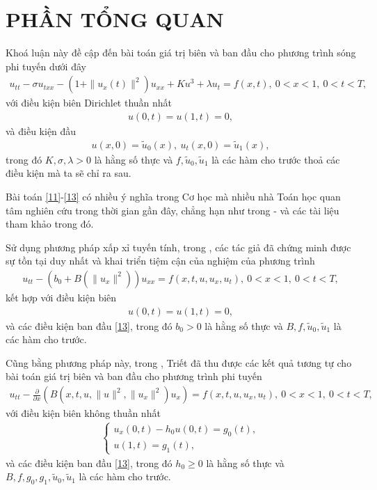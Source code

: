 \documentclass[12pt,a4paper]{article}
\theoremstyle{definition}
\theoremstyle{definition}
\begin{document}
\section[Phần tổng quan]{PHẦN TỔNG QUAN}

Khoá luận này đề cập đến bài toán giá trị biên và ban đầu cho phương trình sóng phi tuyến dưới đây
\begin{align} \label{11}
    u_{tt} - \sigma u_{txx} - \left(1 + \|u_x(t)\|^2\right) u_{xx} + Ku^3 + \lambda u_t = f(x,t),\ 0 < x < 1,\ 0 < t < T,
\end{align}
với điều kiện biên Dirichlet thuần nhất
\begin{align} \label{12}
    u(0,t) = u(1,t) = 0,
\end{align}
và điều kiện đầu
\begin{align} \label{13}
    u(x,0) = \tilde{u}_0(x), \: u_t(x,0) = \tilde{u}_1(x),
\end{align}
trong đó $K, \sigma, \lambda > 0$ là hằng số thực và $f, \tilde{u}_0, \tilde{u}_1$ là các hàm cho trước thoả các điều kiện mà ta sẽ chỉ ra sau.

Bài toán \eqref{11}-\eqref{13} có nhiều ý nghĩa trong Cơ học mà nhiều nhà Toán học quan tâm nghiên cứu trong thời gian gần đây, chẳng hạn như trong \cite{3}-\cite{6} và các tài liệu tham khảo trong đó.

Sử dụng phương pháp xấp xỉ tuyến tính, trong \cite{4}, các tác giả đã chứng minh được sự tồn tại duy nhất và khai triển tiệm cận của nghiệm của phương trình
\begin{align}
    u_{tt} - \left(b_0 + B\left(\|u_x\|^2\right)\right) u_{xx} = f(x,t,u,u_x,u_t),\ 0 < x < 1,\ 0 < t < T,
\end{align}
kết hợp với điều kiện biên
\begin{align}
    u(0,t) = u(1,t) = 0,
\end{align}
và các điều kiện ban đầu \eqref{13}, trong đó $b_0 > 0$ là hằng số thực và $B, f, \tilde{u}_0, \tilde{u}_1$ là các hàm cho trước.

Cũng bằng phương pháp này, trong \cite{6}, Triết đã thu được các kết quả tương tự cho bài toán giá trị biên và ban đầu cho phương trình phi tuyến
\begin{align}
    u_{tt} - \frac{\partial}{\partial x} \left(B\left(x,t,u, \|u\|^2, \|u_x\|^2\right) u_x\right) = f(x,t,u,u_x,u_t), \ 0 < x < 1,\ 0 < t < T,
\end{align}
với điều kiện biên không thuần nhất
\begin{align}
\begin{cases}
    u_x(0,t) - h_0 u(0,t) = g_0(t), \\
    u(1,t) = g_1(t),
\end{cases}
\end{align}
và các điều kiện ban đầu \eqref{13}, trong đó $h_0 \ge 0$ là hằng số thực và $B, f, g_0, g_1, \tilde{u}_0, \tilde{u}_1$ là các hàm cho trước.
\end{document}
